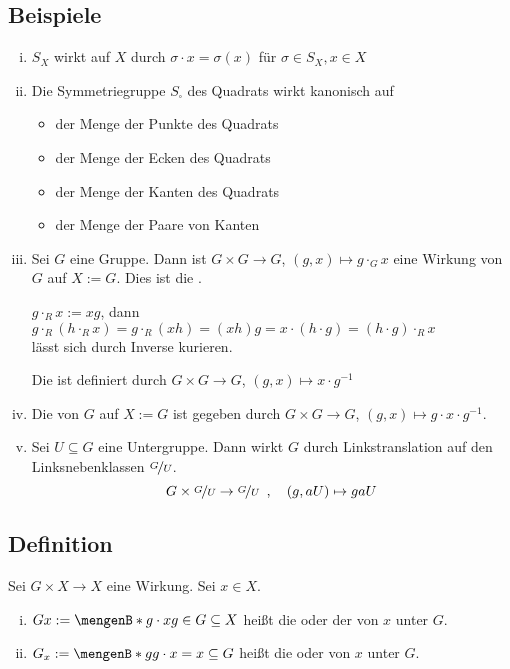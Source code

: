 \subsection[Beispiele für Wirkungen]{Beispiele} %
\label{sub:34}
\begin{enumerate}[i)]
	\item $S_X$ wirkt auf $X$ durch $\sigma \cdot x = \sigma(x)$ für $\sigma \in S_X, x \in X$
	\item Die Symmetriegruppe $S_{\square}$ des Quadrats wirkt kanonisch auf
	\begin{itemize}
		\item der Menge der Punkte des Quadrats
		\item der Menge der Ecken des Quadrats
		\item der Menge der Kanten des Quadrats
		\item der Menge der Paare von Kanten
	\end{itemize}
	\item Sei $G$ eine Gruppe. Dann ist $G \times G \to G$, $(g,x) \mapsto g \cdot_G x$ eine Wirkung von $G$ auf $X:= G$. Dies ist die 
	. 
	
	$g \cdot_R x := x g$, dann $g \cdot_R ( h \cdot_R x) = g \cdot_R (x h) = (x h) g = x \cdot ( h \cdot g) = (h \cdot g) \cdot_R x$ \\lässt sich durch Inverse kurieren.
	
	Die  ist definiert durch $G \times G \to G$, $(g,x) \mapsto x \cdot g ^{-1} $
	\item \label{konj_wirk} Die  von $G$ auf $X:= G$ ist gegeben durch $G \times G \to G$, $(g,x) \mapsto g \cdot x \cdot g ^{-1}$.
	\item Sei $U \subseteq G$ eine Untergruppe. Dann wirkt $G$ durch Linkstranslation auf den Linksnebenklassen $\nicefrac{G}{U}$. 
	\[
		G \times \nicefrac{G}{U} \to \nicefrac{G}{U} \enspace, \quad (g,aU) \mapsto g a U
	\]
\end{enumerate}

\subsection[Definition: Bahn und Standgruppe]{Definition} %
\label{sub:35}
Sei $G \times X \to X$ eine Wirkung. Sei $x \in X$. 
\begin{enumerate}[i)]
	\item $G x := \set[g \cdot x]{g \in G} \subseteq X $ heißt die  oder der  von $x$ unter $G$.
	\item $G_x := \set[g]{g \cdot x = x} \subseteq G $ heißt die  oder  von $x$ unter $G$. 
\end{enumerate}

